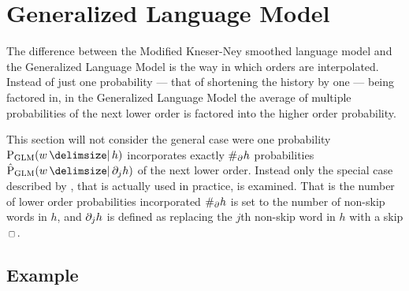 \clearpage
\section{Generalized Language Model}
\label{sec:weightedsum-glm}

The difference between the Modified Kneser-Ney smoothed language model and the
Generalized Language Model is the way in which orders are interpolated.
Instead of just one probability --- that of shortening the history by one ---
being factored in, in the Generalized Language Model the average of multiple
probabilities of the next lower order is factored into the higher order
probability.

This section will not consider the general case were one probability
$\ProbGLM{w}{h}$ incorporates exactly $\NumSkpOp{h}$ probabilities
$\ProbGLM*{w}{\SkpOp[j]{h}}$ of the next lower order.
Instead only the special case described by \textcite{Pickhardt2014}, that is
actually used in practice, is examined.
That is the number of lower order probabilities incorporated $\NumSkpOp{h}$
is set to the number of non-skip words in $h$, and $\SkpOp[j]{h}$ is defined as
replacing the $j$th non-skip word in $h$ with a skip $\Skp$.

\subsection{Example}
\label{subsec:weightedsum-glm-example}

\newcommand{\ProbGLMcab}[2]
  {\frac{\DiscountedCount(w_1 w_2 w_3) + \frac{\gamma(w_1 w_2)}{2}\left(#1 + #2\right)}{\Count(w_1 w_2 \Skp)}}
\newcommand{\ProbGLMcsb}[1]
  {\frac{\DiscountedCount*(\WSkp \Skp w_2 w_3) + \frac{\gamma(\Skp w_2)}{1} #1}{\ContCountIp(\WSkp \Skp w_2 \WSkp)}}
\newcommand{\ProbGLMcas}[1]
  {\frac{\DiscountedCount*(\WSkp w_1 \Skp w_3) + \frac{\gamma(w_1 \Skp)}{1} #1}{\ContCountIp(\WSkp w_1 \Skp \WSkp)}}
\newcommand{\ProbGLMcss}
  {\frac{\ContCountIp(\WSkp \Skp \Skp w_3)}{\ContCountIp(\WSkp \Skp \Skp \WSkp)}}

